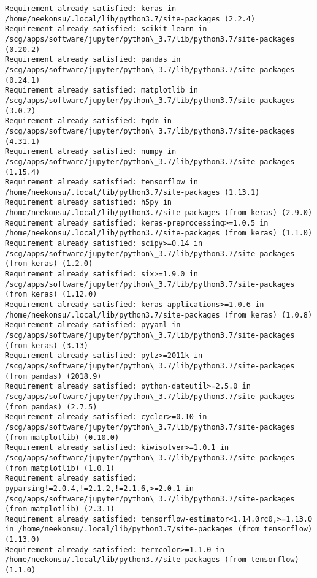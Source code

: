 \documentclass[11pt]{article}
\begin{document}
    \begin{Verbatim}[commandchars=\\\{\}]
Requirement already satisfied: keras in /home/neekonsu/.local/lib/python3.7/site-packages (2.2.4)
Requirement already satisfied: scikit-learn in /scg/apps/software/jupyter/python\_3.7/lib/python3.7/site-packages (0.20.2)
Requirement already satisfied: pandas in /scg/apps/software/jupyter/python\_3.7/lib/python3.7/site-packages (0.24.1)
Requirement already satisfied: matplotlib in /scg/apps/software/jupyter/python\_3.7/lib/python3.7/site-packages (3.0.2)
Requirement already satisfied: tqdm in /scg/apps/software/jupyter/python\_3.7/lib/python3.7/site-packages (4.31.1)
Requirement already satisfied: numpy in /scg/apps/software/jupyter/python\_3.7/lib/python3.7/site-packages (1.15.4)
Requirement already satisfied: tensorflow in /home/neekonsu/.local/lib/python3.7/site-packages (1.13.1)
Requirement already satisfied: h5py in /home/neekonsu/.local/lib/python3.7/site-packages (from keras) (2.9.0)
Requirement already satisfied: keras-preprocessing>=1.0.5 in /home/neekonsu/.local/lib/python3.7/site-packages (from keras) (1.1.0)
Requirement already satisfied: scipy>=0.14 in /scg/apps/software/jupyter/python\_3.7/lib/python3.7/site-packages (from keras) (1.2.0)
Requirement already satisfied: six>=1.9.0 in /scg/apps/software/jupyter/python\_3.7/lib/python3.7/site-packages (from keras) (1.12.0)
Requirement already satisfied: keras-applications>=1.0.6 in /home/neekonsu/.local/lib/python3.7/site-packages (from keras) (1.0.8)
Requirement already satisfied: pyyaml in /scg/apps/software/jupyter/python\_3.7/lib/python3.7/site-packages (from keras) (3.13)
Requirement already satisfied: pytz>=2011k in /scg/apps/software/jupyter/python\_3.7/lib/python3.7/site-packages (from pandas) (2018.9)
Requirement already satisfied: python-dateutil>=2.5.0 in /scg/apps/software/jupyter/python\_3.7/lib/python3.7/site-packages (from pandas) (2.7.5)
Requirement already satisfied: cycler>=0.10 in /scg/apps/software/jupyter/python\_3.7/lib/python3.7/site-packages (from matplotlib) (0.10.0)
Requirement already satisfied: kiwisolver>=1.0.1 in /scg/apps/software/jupyter/python\_3.7/lib/python3.7/site-packages (from matplotlib) (1.0.1)
Requirement already satisfied: pyparsing!=2.0.4,!=2.1.2,!=2.1.6,>=2.0.1 in /scg/apps/software/jupyter/python\_3.7/lib/python3.7/site-packages (from matplotlib) (2.3.1)
Requirement already satisfied: tensorflow-estimator<1.14.0rc0,>=1.13.0 in /home/neekonsu/.local/lib/python3.7/site-packages (from tensorflow) (1.13.0)
Requirement already satisfied: termcolor>=1.1.0 in /home/neekonsu/.local/lib/python3.7/site-packages (from tensorflow) (1.1.0)

\end{Verbatim}
\end{document}
